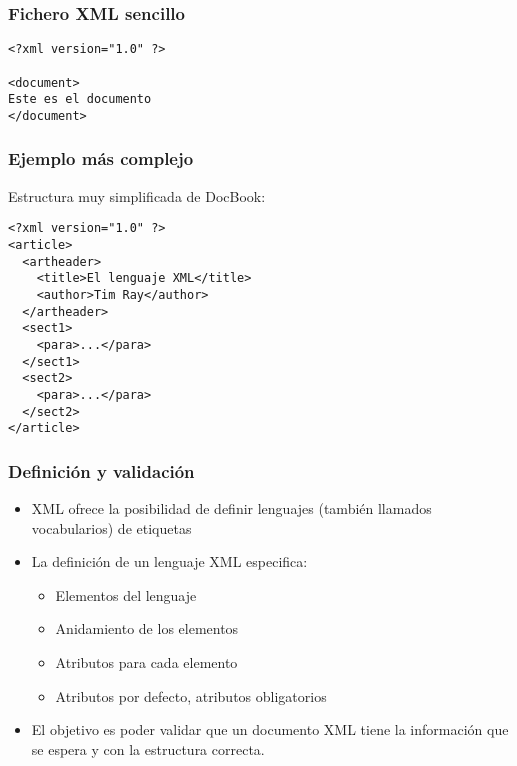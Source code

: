 
\begin{frame}[fragile]
\frametitle{Fichero XML sencillo}

\begin{verbatim}
<?xml version="1.0" ?>

<document>
Este es el documento
</document>
\end{verbatim}

\end{frame}


\begin{frame}[fragile]
\frametitle{Ejemplo más complejo}

Estructura muy simplificada de DocBook:

\begin{verbatim}
<?xml version="1.0" ?>
<article>
  <artheader>
    <title>El lenguaje XML</title>
    <author>Tim Ray</author>
  </artheader>
  <sect1>
    <para>...</para>
  </sect1>
  <sect2>
    <para>...</para>
  </sect2>
</article>
\end{verbatim}

\end{frame}


\begin{frame}
\frametitle{Definición y validación}

\begin{itemize}
\item XML ofrece la posibilidad de definir lenguajes (también llamados vocabularios) de etiquetas
\item La definición de un lenguaje XML especifica:
  \begin{itemize}
  \item Elementos del lenguaje
  \item Anidamiento de los elementos
  \item Atributos para cada elemento
  \item Atributos por defecto, atributos obligatorios
  \end{itemize}
\item El objetivo es poder validar que un documento XML tiene la información que se espera y con la estructura correcta.
\end{itemize}

\end{frame}

